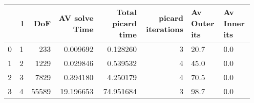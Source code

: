 \begin{tabular}{lrrrrrll}
\toprule
{} &  l &    DoF &  AV solve Time &  Total picard time &  picard iterations & Av Outer its & Av Inner its \\
\midrule
0 &  1 &    233 &       0.009692 &           0.128260 &                  3 &         20.7 &          0.0 \\
1 &  2 &   1229 &       0.029846 &           0.539532 &                  4 &         45.0 &          0.0 \\
2 &  3 &   7829 &       0.394180 &           4.250179 &                  4 &         70.5 &          0.0 \\
3 &  4 &  55589 &      19.196653 &          74.951684 &                  3 &         98.7 &          0.0 \\
\bottomrule
\end{tabular}
